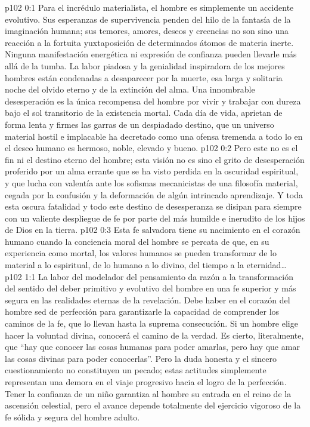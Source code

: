 \author{Melquisedec}
\vs p102 0:1 Para el incrédulo materialista, el hombre es simplemente un accidente evolutivo. Sus esperanzas de supervivencia penden del hilo de la fantasía de la imaginación humana; sus temores, amores, deseos y creencias no son sino una reacción a la fortuita yuxtaposición de determinados átomos de materia inerte. Ninguna manifestación energética ni expresión de confianza pueden llevarle más allá de la tumba. La labor piadosa y la genialidad inspiradora de los mejores hombres están condenadas a desaparecer por la muerte, esa larga y solitaria noche del olvido eterno y de la extinción del alma. Una innombrable desesperación es la única recompensa del hombre por vivir y trabajar con dureza bajo el sol transitorio de la existencia mortal. Cada día de vida, aprietan de forma lenta y firmes las garras de un despiadado destino, que un universo material hostil e implacable ha decretado como una ofensa tremenda a todo lo en el deseo humano es hermoso, noble, elevado y bueno.
\vs p102 0:2 Pero este no es el fin ni el destino eterno del hombre; esta visión no es sino el grito de desesperación proferido por un alma errante que se ha visto perdida en la oscuridad espiritual, y que lucha con valentía ante los sofismas mecanicistas de una filosofía material, cegada por la confusión y la deformación de algún intrincado aprendizaje. Y toda esta oscura fatalidad y todo este destino de desesperanza se disipan para siempre con un valiente despliegue de fe por parte del más humilde e inerudito de los hijos de Dios en la tierra.
\vs p102 0:3 Esta fe salvadora tiene su nacimiento en el corazón humano cuando la conciencia moral del hombre se percata de que, en su experiencia como mortal, los valores humanos se pueden transformar de lo material a lo espiritual, de lo humano a lo divino, del tiempo a la eternidad\ldots
{}
\vs p102 1:1 La labor del modelador del pensamiento da razón a la transformación del sentido del deber primitivo y evolutivo del hombre en una fe superior y más segura en las realidades eternas de la revelación. Debe haber en el corazón del hombre sed de perfección para garantizarle la capacidad de comprender los caminos de la fe, que lo llevan hasta la suprema consecución. Si un hombre elige hacer la voluntad divina, conocerá el camino de la verdad. Es cierto, literalmente, que “hay que conocer las cosas humanas para poder amarlas, pero hay que amar las cosas divinas para poder conocerlas”. Pero la duda honesta y el sincero cuestionamiento no constituyen un pecado; estas actitudes simplemente representan una demora en el viaje progresivo hacia el logro de la perfección. Tener la confianza de un niño garantiza al hombre su entrada en el reino de la ascensión celestial, pero el avance depende totalmente del ejercicio vigoroso de la fe sólida y segura del hombre adulto.
